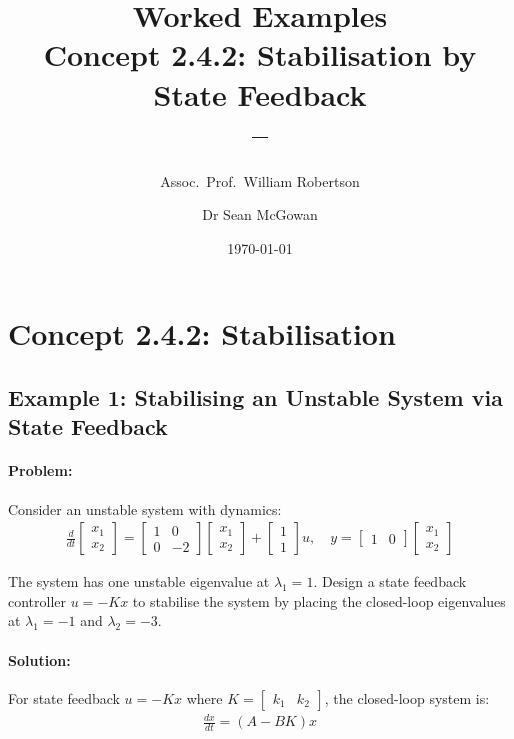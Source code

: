 \documentclass[11pt,a4paper]{article}
\title{\textbf{Worked Examples}\\[0.5em]
\large Concept 2.4.2: Stabilisation by State Feedback\\[0.3em]
\normalsize \coursesubtitle{} -- \coursetitle}
\author{Assoc.\ Prof.\ William Robertson \and Dr Sean McGowan}
\date{\today}
\begin{document}
\maketitle
\tableofcontents
\newpage

\section{Concept 2.4.2: Stabilisation}

\subsection{Example 1: Stabilising an Unstable System via State Feedback}

\paragraph{Problem:} Consider an unstable system with dynamics:
\begin{align}
  \frac{d}{dt}\begin{bmatrix} x_1 \\ x_2 \end{bmatrix} = \begin{bmatrix} 1 & 0 \\ 0 & -2 \end{bmatrix}\begin{bmatrix} x_1 \\ x_2 \end{bmatrix} + \begin{bmatrix} 1 \\ 1 \end{bmatrix}u, \quad y = \begin{bmatrix} 1 & 0 \end{bmatrix}\begin{bmatrix} x_1 \\ x_2 \end{bmatrix}
\end{align}

The system has one unstable eigenvalue at $\lambda_1 = 1$. Design a state feedback controller $u = -Kx$ to stabilise the system by placing the closed-loop eigenvalues at $\lambda_1 = -1$ and $\lambda_2 = -3$.

\paragraph{Solution:}

For state feedback $u = -Kx$ where $K = \begin{bmatrix} k_1 & k_2 \end{bmatrix}$, the closed-loop system is:
\begin{align}
  \frac{dx}{dt} = (A - BK)x
\end{align}
\end{document}
